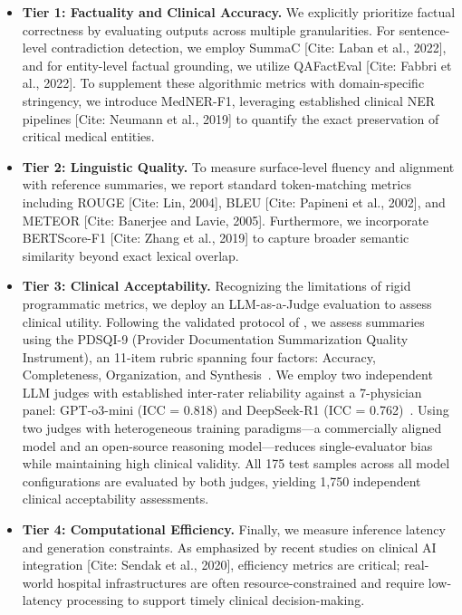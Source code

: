 \documentclass[11pt]{article}
\begin{document}
\begin{itemize}
    \item \textbf{Tier 1: Factuality and Clinical Accuracy.} We explicitly prioritize factual correctness by evaluating outputs across multiple granularities. For sentence-level contradiction detection, we employ SummaC [Cite: Laban et al., 2022], and for entity-level factual grounding, we utilize QAFactEval [Cite: Fabbri et al., 2022]. To supplement these algorithmic metrics with domain-specific stringency, we introduce MedNER-F1, leveraging established clinical NER pipelines [Cite: Neumann et al., 2019] to quantify the exact preservation of critical medical entities.
    
    \item \textbf{Tier 2: Linguistic Quality.} To measure surface-level fluency and alignment with reference summaries, we report standard token-matching metrics including ROUGE [Cite: Lin, 2004], BLEU [Cite: Papineni et al., 2002], and METEOR [Cite: Banerjee and Lavie, 2005]. Furthermore, we incorporate BERTScore-F1 [Cite: Zhang et al., 2019] to capture broader semantic similarity beyond exact lexical overlap.
    
    \item \textbf{Tier 3: Clinical Acceptability.} Recognizing the limitations of rigid programmatic metrics, we deploy an LLM-as-a-Judge evaluation to assess clinical utility. Following the validated protocol of \citet{croxford2025evaluating}, we assess summaries using the PDSQI-9 (Provider Documentation Summarization Quality Instrument), an 11-item rubric spanning four factors: Accuracy, Completeness, Organization, and Synthesis~\citep{croxford2025pdsqi}. We employ two independent LLM judges with established inter-rater reliability against a 7-physician panel: GPT-o3-mini (ICC = 0.818) and DeepSeek-R1 (ICC = 0.762)~\citep{croxford2025evaluating}. Using two judges with heterogeneous training paradigms---a commercially aligned model and an open-source reasoning model---reduces single-evaluator bias while maintaining high clinical validity. All 175 test samples across all model configurations are evaluated by both judges, yielding 1,750 independent clinical acceptability assessments.
    
    \item \textbf{Tier 4: Computational Efficiency.} Finally, we measure inference latency and generation constraints. As emphasized by recent studies on clinical AI integration [Cite: Sendak et al., 2020], efficiency metrics are critical; real-world hospital infrastructures are often resource-constrained and require low-latency processing to support timely clinical decision-making.
\end{itemize}
\end{document}
